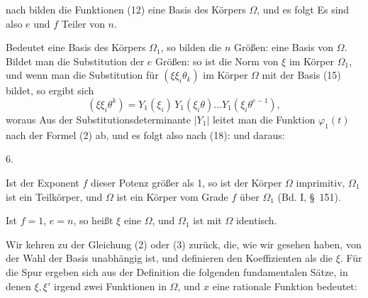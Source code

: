 nach bilden die Funktionen (12) eine Basis des Körpers $\Omega$, und es folgt
Es sind also $e$ und $f$ Teiler von $n$.

Bedeutet
eine Basis des Körpers $\Omega_1$, so bilden die $n$ Größen:
eine Basis von $\Omega$. Bildet man die Substitution der $e$ Größen:
so ist
die Norm von $\xi$ im Körper $\Omega_1$, und wenn man die Substitution für $(\xi \xi_i \theta_k)$ im Körper $\Omega$ mit der Basis (15) bildet, so ergibt sich
\[
(\xi \xi_i \theta^k) = Y_1(\xi_i)\, Y_1(\xi_i \theta) \dots Y_1(\xi_i \theta^{e-1}),
\]
woraus
Aus der Substitutionsdeterminante $|Y_1|$ leitet man die Funktion $\varphi_1(t)$ nach der Formel (2) ab, und es folgt also nach (18):
und daraus:

6. 

Ist der Exponent $f$ dieser Potenz größer als 1, so ist der Körper $\Omega$ imprimitiv, $\Omega_1$ ist ein Teilkörper, und $\Omega$ ist ein Körper vom Grade $f$ über $\Omega_1$ (Bd. I, \S\ 151).

Ist $f = 1$, $e = n$, so heißt $\xi$ eine  $\Omega$, und $\Omega_1$ ist mit $\Omega$ identisch.

Wir kehren zu der Gleichung (2) oder (3) zurück, die, wie wir gesehen haben, von der Wahl der Basis unabhängig ist, und definieren den Koeffizienten
als die  $\xi$. Für die Spur ergeben sich aus der Definition die folgenden fundamentalen Sätze, in denen $\xi, \xi'$ irgend zwei Funktionen in $\Omega$, und $x$ eine rationale Funktion bedeutet:
